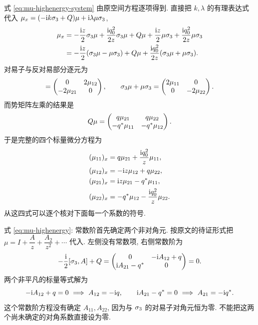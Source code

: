 \par\smallskip\noindent 式 \eqref{eq:mu-highenergy-system} 由原空间方程逐项得到.\quad
直接把 $k,\lambda$ 的有理表达式代入
$\mu_x=(-\mathrm{i} k\sigma_3+Q)\mu+\mathrm{i}\lambda\mu\sigma_3$,
\begin{align*}
\mu_x
&=-\dfrac{\mathrm{i} z}{2}\sigma_3\mu
+\dfrac{\mathrm{i} q_0^2}{2z}\sigma_3\mu
+Q\mu
+\dfrac{\mathrm{i} z}{2}\mu\sigma_3
+\dfrac{\mathrm{i} q_0^2}{2z}\mu\sigma_3\\
&=-\dfrac{\mathrm{i} z}{2}(\sigma_3\mu-\mu\sigma_3)
+Q\mu+\dfrac{\mathrm{i} q_0^2}{2z}(\sigma_3\mu+\mu\sigma_3).
\end{align*}
对易子与反对易部分逐元为
\begin{equation*}
[\sg,\mu]=\begin{pmatrix}0&2\mu_{12}\\-2\mu_{21}&0\end{pmatrix},
\qquad
\sg\mu+\mu\sg=\begin{pmatrix}2\mu_{11}&0\\0&-2\mu_{22}\end{pmatrix}.
\end{equation*}
而势矩阵左乘的结果是
\begin{equation*}
Q\mu=\begin{pmatrix}
q\mu_{21}&q\mu_{22}\\
-{q}^{*}\mu_{11}&-{q}^{*}\mu_{12}
\end{pmatrix}.
\end{equation*}
于是完整的四个标量微分方程为
\begin{align*}
(\mu_{11})_x&=q\mu_{21}+\dfrac{\mathrm{i} q_0^2}{z}\mu_{11},\\
(\mu_{12})_x&=-\mathrm{i} z\mu_{12}+q\mu_{22},\\
(\mu_{21})_x&=\mathrm{i} z\mu_{21}-{q}^{*}\mu_{11},\\
(\mu_{22})_x&=-{q}^{*}\mu_{12}-\dfrac{\mathrm{i} q_0^2}{z}\mu_{22}.
\end{align*}
从这四式可以逐个核对下面每一个系数的符号.

\par\smallskip\noindent 式 \eqref{eq:mu-highenergy}: 常数阶首先确定两个非对角元.\quad
按原文的待证形式把 $\mu=I+\dfrac{A}{z}+\dfrac{A_2}{z^2}+\cdots$ 代入.
左侧没有常数项, 右侧常数阶为
\begin{equation*}
-\dfrac{\mathrm{i}}{2}[\sigma_3,A]+Q
=\begin{pmatrix}
0&-\mathrm{i} A_{12}+q\\
\mathrm{i} A_{21}-{q}^{*}&0
\end{pmatrix}=0.
\end{equation*}
两个非平凡的标量等式解为
\begin{equation*}
-\mathrm{i} A_{12}+q=0\ \Longrightarrow\ A_{12}=-\mathrm{i} q,
\qquad
\mathrm{i} A_{21}-{q}^{*}=0\ \Longrightarrow\ A_{21}=-\mathrm{i}{q}^{*}.
\end{equation*}
这个常数阶方程没有确定 $A_{11},A_{22}$,
因为与 $\sigma_3$ 的对易子对角元恒为零.
不能把这两个尚未确定的对角系数直接设为零.

